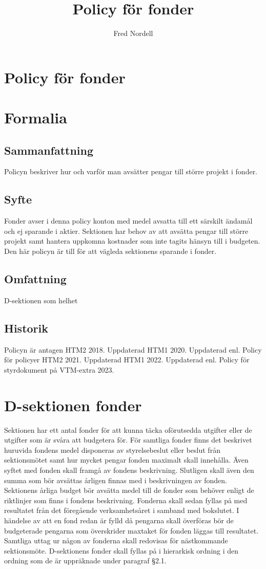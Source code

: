 \documentclass{dsekprotokoll}
\title{Policy för fonder}
\author{Fred Nordell}
\begin{document}
\section*{Policy för fonder}
\section{Formalia}
\subsection{Sammanfattning}
Policyn beskriver hur och varför man avsätter pengar till större projekt i fonder.
\subsection{Syfte}
Fonder avser i denna policy konton med medel avsatta till ett särskilt ändamål och ej sparande i aktier. Sektionen har behov av att avsätta pengar till större projekt samt hantera uppkomna kostnader som inte tagits hänsyn till i budgeten. Den här policyn är till för att vägleda sektionens sparande i fonder.
\subsection{Omfattning}
D-sektionen som helhet
\subsection{Historik}
Policyn är antagen HTM2 2018.
Uppdaterad HTM1 2020.
Uppdaterad enl. Policy för policyer HTM2 2021.
Uppdaterad HTM1 2022.
Uppdaterad enl. Policy för styrdokument på VTM-extra 2023.

\section{D-sektionen fonder}
Sektionen har ett antal fonder för att kunna täcka oförutsedda utgifter eller de utgifter som är svåra att budgetera för.
För samtliga fonder finns det beskrivet huruvida fondens medel disponeras av styrelsebeslut eller beslut från sektionsmötet
samt hur mycket pengar fonden maximalt skall innehålla. Även syftet med fonden skall framgå av fondens beskrivning.
Slutligen skall även den summa som bör avsättas årligen finnas med i beskrivningen av fonden. Sektionens årliga budget
bör avsätta medel till de fonder som behöver enligt de riktlinjer som finns i fondens beskrivning.
Fonderna skall sedan fyllas på med resultatet från det föregående verksamhetsåret i samband med bokslutet.
I händelse av att en fond redan är fylld då pengarna skall överföras bör de budgeterade pengarna som överskrider maxtaket
för fonden läggas till resultatet. Samtliga uttag ur någon av fonderna skall redovisas för nästkommande sektionsmöte.
D-sektionens fonder skall fyllas på i hierarkisk ordning i den ordning som de är uppräknade under paragraf §2.1.
\end{document}
